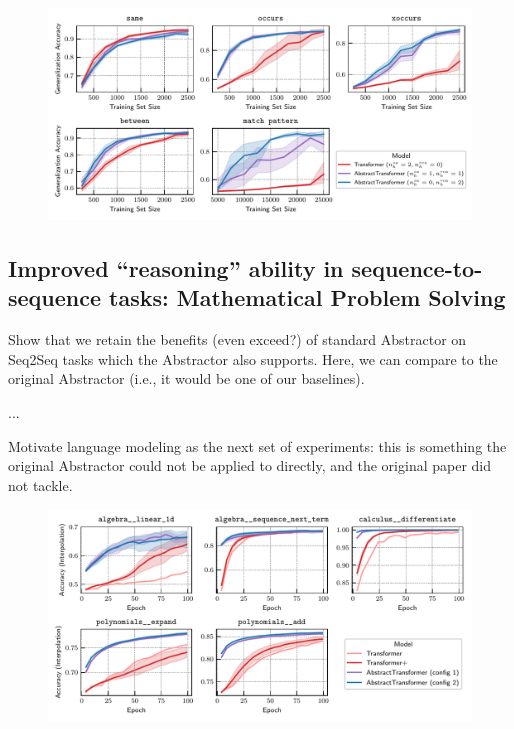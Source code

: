 \begin{figure}
    \includegraphics[width=\textwidth]{figs/experiments/relgames_learning_curves.pdf}
    \caption{}\label{fig:relgames_learning_curves}
\end{figure}

\subsection{Improved ``reasoning'' ability in sequence-to-sequence tasks: Mathematical Problem Solving}\label{ssec:math}

Show that we retain the benefits (even exceed?) of standard Abstractor on Seq2Seq tasks which the Abstractor also supports. Here, we can compare to the original Abstractor (i.e., it would be one of our baselines).

...

Motivate language modeling as the next set of experiments: this is something the original Abstractor could not be applied to directly, and the original paper did not tackle.

\begin{figure}
    \includegraphics[width=\textwidth]{figs/experiments/math_training_curves_interpolation.pdf}
    \caption{}\label{fig:math_training_curves_interpolation}
\end{figure}

